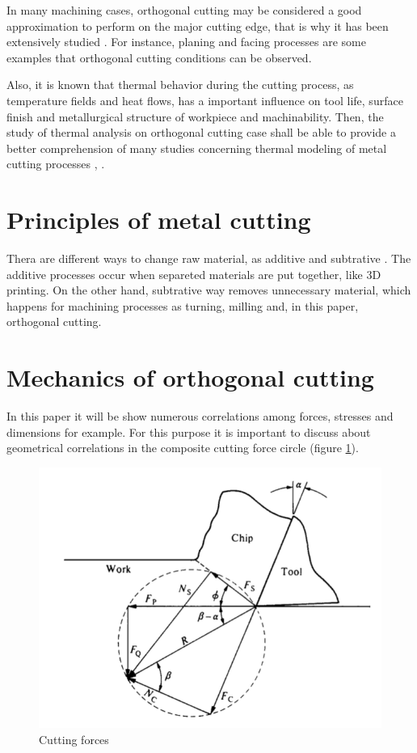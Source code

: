 	In many machining cases, orthogonal cutting may be considered a good approximation to perform on the major cutting edge, that is why it has been extensively studied \cite{shaw2005metal}. For instance, planing and facing processes are some examples that orthogonal cutting conditions can be observed.

	Also, it is known that thermal behavior during the cutting process, as temperature fields and heat flows, has a important influence on tool life, surface finish and metallurgical structure of workpiece and machinability. Then, the study of thermal analysis on orthogonal cutting case shall be able to provide a better comprehension of many studies concerning thermal modeling of metal cutting processes \cite{komanduri2000thermal}, \cite{komanduri2001thermal}.
	
	\section{Principles of metal cutting}
	Thera are different ways to change raw material, as additive and subtrative \cite{shaw2005metal}. The additive processes occur when separeted materials are put together, like 3D printing. On the other hand, subtrative way removes unnecessary material, which happens for machining processes as turning, milling and, in this paper, orthogonal cutting.

	\section{Mechanics of orthogonal cutting}

	In this paper it will be show numerous correlations among forces, stresses and dimensions for example. For this purpose it is important to discuss about geometrical correlations in the composite cutting force circle (figure \ref{fig:circlec}).

	\begin{figure}[h]
		\centering
		\captionsetup{justification=centering}
		\includegraphics[scale=0.5]{Cap1/circlec.png}
		\caption{Cutting forces \cite{shaw2005metal}}
		\label{fig:circlec}
	\end{figure}

